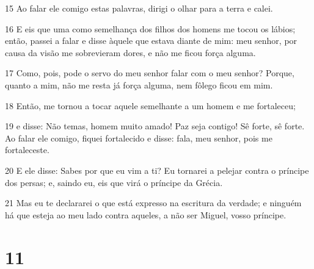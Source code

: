 \par 15 Ao falar ele comigo estas palavras, dirigi o olhar para a terra e calei.
\par 16 E eis que uma como semelhança dos filhos dos homens me tocou os lábios; então, passei a falar e disse àquele que estava diante de mim: meu senhor, por causa da visão me sobrevieram dores, e não me ficou força alguma.
\par 17 Como, pois, pode o servo do meu senhor falar com o meu senhor? Porque, quanto a mim, não me resta já força alguma, nem fôlego ficou em mim.
\par 18 Então, me tornou a tocar aquele semelhante a um homem e me fortaleceu;
\par 19 e disse: Não temas, homem muito amado! Paz seja contigo! Sê forte, sê forte. Ao falar ele comigo, fiquei fortalecido e disse: fala, meu senhor, pois me fortaleceste.
\par 20 E ele disse: Sabes por que eu vim a ti? Eu tornarei a pelejar contra o príncipe dos persas; e, saindo eu, eis que virá o príncipe da Grécia.
\par 21 Mas eu te declararei o que está expresso na escritura da verdade; e ninguém há que esteja ao meu lado contra aqueles, a não ser Miguel, vosso príncipe.

\chapter{11}


